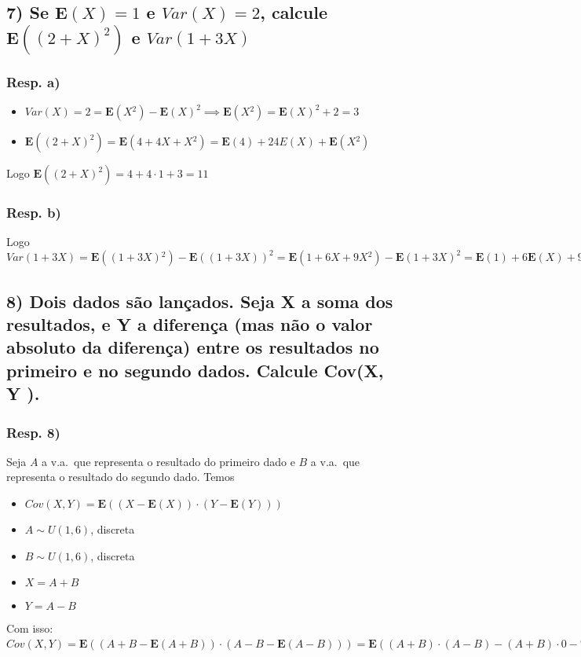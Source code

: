\documentclass[portuguese]{article}
\begin{document}
\subsection*{\textmd{7) Se $\mathbf{E}(X)=1$ e $Var(X)=2$, calcule }$\mathbf{E}((2+X)^{2})$\textmd{
e $Var(1+3X)$}}


\subsubsection*{\textmd{Resp. a) }}
\begin{itemize}
\item $Var(X)=2=\mathbf{E}(X{}^{2})-\mathbf{E}(X)^{2}\implies\mathbf{E}(X{}^{2})=\mathbf{E}(X)^{2}+2=3$
\item $\mathbf{E}((2+X)^{2})=\mathbf{E}(4+4X+X{}^{2})=\mathbf{E}(4)+24E(X)+\mathbf{E}(X{}^{2})$
\end{itemize}
Logo $\mathbf{E}((2+X)^{2})=4+4\cdot1+3=11$


\subsubsection*{\textmd{Resp. b)}}

Logo $Var(1+3X)=\mathbf{E}((1+3X){}^{2})-\mathbf{E}((1+3X))^{2}=\mathbf{E}(1+6X+9X{}^{2})-\mathbf{E}(1+3X)^{2}=\mathbf{E}(1)+6\mathbf{E}(X)+9\mathbf{E}(X{}^{2})-\mathbf{E}(1+3X)^{2}=34-(\mathbf{E}(1)+3\mathbf{E}(X))\cdot(\mathbf{E}(1)+3\mathbf{E}(X))=34-(1+3\cdot1)\cdot(1+3\cdot1)=18$


\subsection*{\textcompwordmark{}}


\subsection*{\textmd{8) Dois dados são lançados. Seja X a soma dos resultados,
e Y a diferença (mas não o valor absoluto da diferença) entre os resultados
no primeiro e no segundo dados. Calcule Cov(X, Y ).}}


\subsubsection*{\textmd{Resp. 8) }}
Seja $A$ a v.a.~que representa o resultado do primeiro dado e $B$ a v.a.~que representa o resultado do segundo dado. Temos
\begin{itemize}
\item $Cov(X,Y)=\mathbf{E}((X-\mathbf{E}(X))\cdot(Y-\mathbf{E}(Y)))$
\item $A\sim U(1,6)$, discreta
\item $B\sim U(1,6)$, discreta
\item $X=A+B$
\item $Y=A-B$
\end{itemize}
Com isso: $Cov(X,Y)=\mathbf{E}((A+B-\mathbf{E}(A+B))\cdot(A-B-\mathbf{E}(A-B)))=\mathbf{E}((A+B)\cdot(A-B)-(A+B)\cdot0-7\cdot(A-B)+7\cdot0)=\mathbf{E}((A^{2}-B^{2}-7\cdot(A-B))=\mathbf{E}(A^{2})-\mathbf{E}(B^{2})=0$
\end{document}
